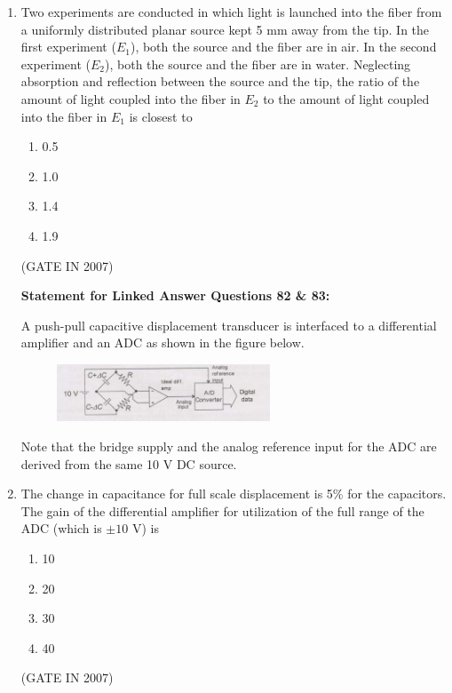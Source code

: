 \documentclass[journal]{IEEEtran}
\begin{document}
\begin{enumerate}
\begin{multicols}{4}
\begin{enumerate}
\item 15$^\circ$  
\item 16$^\circ$  
\item 17$^\circ$  
\item 18$^\circ$  
\end{enumerate}
\end{multicols}
\hfill(GATE IN 2007)

\item 
Two experiments are conducted in which light is launched into the fiber from a uniformly distributed planar source kept 5 mm away from the tip. In the first experiment ($E_1$), both the source and the fiber are in air. In the second experiment ($E_2$), both the source and the fiber are in water. Neglecting absorption and reflection between the source and the tip, the ratio of the amount of light coupled into the fiber in $E_2$ to the amount of light coupled into the fiber in $E_1$ is closest to  

\begin{multicols}{4}
\begin{enumerate}
\item 0.5  
\item 1.0  
\item 1.4  
\item 1.9  
\end{enumerate}
\end{multicols}
\hfill(GATE IN 2007)

\textbf{Statement for Linked Answer Questions 82 \& 83:}  

A push-pull capacitive displacement transducer is interfaced to a differential amplifier and an ADC as shown in the figure below.  
\begin{figure}[H]
    \centering
      \includegraphics[width=0.6\textwidth]{63.jpg} 
      \caption{}
    \label{fig:fig63} 
\end{figure}
Note that the bridge supply and the analog reference input for the ADC are derived from the same 10 V DC source. 

\item The change in capacitance for full scale displacement is 5\% for the capacitors. The gain of the differential amplifier for utilization of the full range of the ADC (which is $\pm 10$ V) is
\begin{multicols}{4}
\begin{enumerate}
\item 10  
\item 20  
\item 30 
\item 40  
\end{enumerate}
\end{multicols}
\hfill(GATE IN 2007)


\end{enumerate}
\end{document}
